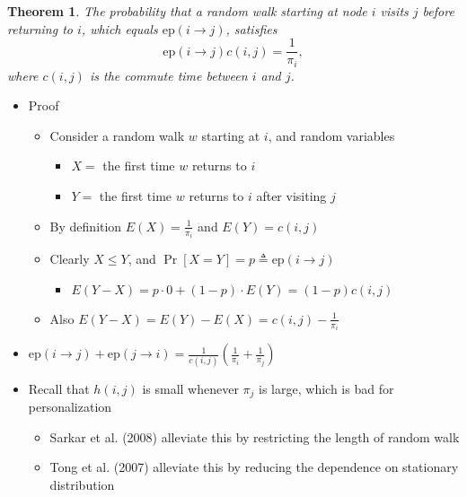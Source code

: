 \documentclass{article}
\newtheorem*{mythm*}{Theorem}
\begin{document}
\begin{mythm*}
The probability that a random walk starting at node $i$ visits $j$ before returning to $i$, which equals $\mathrm{ep}(i\rightarrow j)$, satisfies
\[
\mathrm{ep}(i\rightarrow j)c(i,j) = \frac{1}{\pi_i},
\]
where $c(i,j)$ is the commute time between $i$ and $j$.
\end{mythm*}

\begin{itemize}
\item Proof
\begin{itemize}
\item Consider a random walk $w$ starting at $i$, and random variables
\begin{itemize}
\item $X = $ the first time $w$ returns to $i$
\item $Y = $ the first time $w$ returns to $i$ after visiting $j$
\end{itemize}
\item By definition $E(X) = \frac{1}{\pi_i}$ and $E(Y) = c(i,j)$
\item Clearly $X \leq Y$, and $\Pr\left[X = Y\right] = p \triangleq \mathrm{ep}(i\rightarrow j)$
\begin{itemize}
\item $E(Y - X) = p\cdot 0 + (1 - p)\cdot E(Y) = (1-p) c(i,j)$
\end{itemize}
\item Also $E(Y - X) = E(Y) - E(X) = c(i,j) - \frac{1}{\pi_i}$
\end{itemize}
\end{itemize}

\begin{itemize}
\item $\mathrm{ep}(i\rightarrow j) + \mathrm{ep}(j\rightarrow i) = \frac{1}{c(i,j)}\left(\frac{1}{\pi_i} + \frac{1}{\pi_j}\right)$
\item Recall that $h(i,j)$ is small whenever $\pi_j$ is large, which is bad for personalization
\begin{itemize}
\item Sarkar et al. (2008) alleviate this by restricting the length of random walk
\item Tong et al. (2007) alleviate this by reducing the dependence on stationary distribution
\end{itemize}
\end{itemize}
\end{document}
